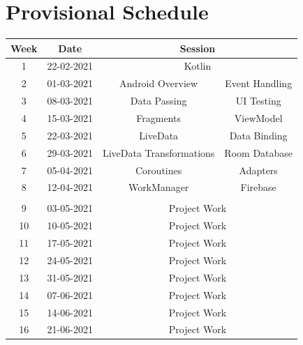 \documentclass{article}
\begin{document}
\section*{Provisional Schedule}
\renewcommand{\arraystretch}{1.5}
\begin{tabular}{|c|c|c|c|}
	\hline
	\textbf{Week} & \textbf{Date}     & \multicolumn{2}{c|}{\textbf{Session}}          \\ \hline
	\small 1      & \small 22-02-2021 & \multicolumn{2}{c|}{\small Kotlin}             \\ \hline
	\small 2 & \small 01-03-2021 & Android Overview         & Event Handling \\ \hline
	\small 3 & \small 08-03-2021 & Data Passing             & UI Testing     \\ \hline
	\small 4 & \small 15-03-2021 & Fragments                & ViewModel      \\ \hline
	\small 5 & \small 22-03-2021 & LiveData                 & Data Binding   \\ \hline
	\small 6 & \small 29-03-2021 & LiveData Transformations & Room Database  \\ \hline
	\small 7 & \small 05-04-2021 & Coroutines               & Adapters       \\ \hline
	\small 8 & \small 12-04-2021 & WorkManager              & Firebase       \\ \hline
	\rowcolor{yellow} \multicolumn{4}{|c|}{\small Mid Term Break}  \\ \hline
	\small 9      & \small 03-05-2021 & \multicolumn{2}{c|}{\small Project Work}       \\ \hline
	\small 10     & \small 10-05-2021 & \multicolumn{2}{c|}{\small Project Work}       \\ \hline
	\small 11     & \small 17-05-2021 & \multicolumn{2}{c|}{\small Project Work}       \\ \hline
	\small 12     & \small 24-05-2021 & \multicolumn{2}{c|}{\small Project Work}       \\ \hline
	\small 13     & \small 31-05-2021 & \multicolumn{2}{c|}{\small Project Work}       \\ \hline
	\small 14     & \small 07-06-2021 & \multicolumn{2}{c|}{\small Project Work}       \\ \hline
	\small 15     & \small 14-06-2021 & \multicolumn{2}{c|}{\small Project Work}       \\ \hline
	\small 16     & \small 21-06-2021 & \multicolumn{2}{c|}{\small Project Work}       \\ \hline
\end{tabular}
\end{document}
